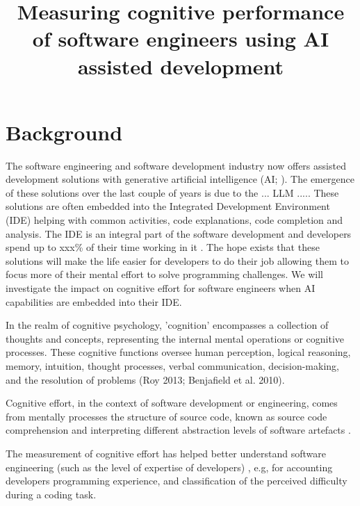 \documentclass[man]{apa7}
\title{Measuring cognitive performance of software engineers using AI assisted development}
\begin{document}
\maketitle
\onecolumn

\section{Background}
The software engineering and software development industry now offers assisted development solutions with generative artificial intelligence (AI; \cite{Nguyen-Duc2023GenerativeAgenda}). The emergence of these solutions over the last couple of years is due to the ... LLM ..... These solutions are often embedded into the Integrated Development Environment (IDE) helping with common activities, code explanations, code completion and analysis. The IDE is an integral part of the software development and developers spend up to xxx\% of their time working in it \parencite{}. The hope exists that these solutions will make the life easier for developers to do their job allowing them to focus more of their mental effort to solve programming challenges. We will investigate the impact on cognitive effort for software engineers when AI capabilities are embedded into their IDE.

In the realm of cognitive psychology, 'cognition' encompasses a collection of thoughts and concepts, representing the internal mental operations or cognitive processes. These cognitive functions oversee human perception, logical reasoning, memory, intuition, thought processes, verbal communication, decision-making, and the resolution of problems \parencite{}(Roy 2013; Benjafield et al. 2010).

Cognitive effort, in the context of software development or engineering, comes from mentally processes the structure of source code, known as source code comprehension \parencite{Crk2016AssessingComprehension, Crk2015UnderstandingExpertise} and interpreting different abstraction levels of software artefacts \parencite{Minas2017NeurophysiologicalDevelopers}. 

The measurement of cognitive effort has helped better understand software engineering (such as the level of expertise of developers) \parencite{Crk2016AssessingComprehension, Crk2015UnderstandingExpertise}, e.g, for accounting developers programming experience, and classification of the perceived difficulty \parencite{Fritz2014UsingDevelopment, Fritz2016LeveragingProductivity} during a coding task.
\end{document}

